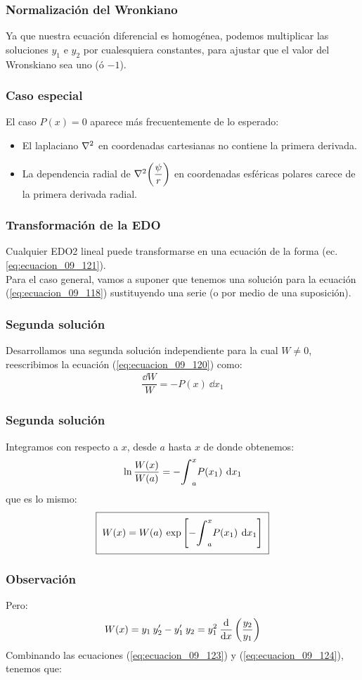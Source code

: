 \documentclass[12pt]{beamer}
\begin{document}
\begin{frame}
\frametitle{Normalización del Wronkiano}
Ya que nuestra ecuación diferencial es homogénea, podemos multiplicar las soluciones $y_{1}$ e $y_{2}$ por cualesquiera constantes, para ajustar que el valor del Wronskiano sea uno (ó $-1$).
\end{frame}
\begin{frame}
\frametitle{Caso especial}
El caso $P(x) = 0$ aparece más frecuentemente de lo esperado:
\begin{itemize}
\item[\ding{212}] El laplaciano $\laplacian$ en coordenadas cartesianas no contiene la primera derivada.
\item[\ding{212}] La dependencia radial de $\laplacian (\dfrac{\psi}{r})$ en coordenadas esféricas polares carece de la primera derivada radial.
\end{itemize}
\end{frame}
\begin{frame}
\frametitle{Transformación de la EDO}
Cualquier EDO2 lineal puede transformarse en una ecuación de la forma (ec. \ref{eq:ecuacion_09_121}).
\\
\bigskip
\pause
Para el caso general, vamos a suponer que tenemos una solución para la ecuación (\ref{eq:ecuacion_09_118}) sustituyendo una serie (o por medio de una suposición). 
\end{frame}
\begin{frame}
\frametitle{Segunda solución}
Desarrollamos una segunda solución independiente para la cual $W \neq 0$, reescribimos la ecuación (\ref{eq:ecuacion_09_120}) como:
\pause
\begin{align*}
\dfrac{\dd{W}}{W} = - P(x) \: \dd{x_{1}}
\end{align*}
\end{frame}
\begin{frame}
\frametitle{Segunda solución}
Integramos con respecto a $x$, desde $a$ hasta $x$ de donde obtenemos:
\pause
\begin{align*}
\ln \dfrac{W(x)}{W(a)} = - \scaleint{6ex}_{a}^{x} P(x_{1}) \: \dd{x_{1}}
\end{align*}
\pause
que es lo mismo:
\pause
\begin{align}
\setlength{\fboxsep}{2\fboxsep}\boxed{W(x) = W(a) \: \exp \left[ - \scaleint{6ex}_{a}^{x} P(x_{1}) \: \dd{x_{1}} \right]}
\label{eq:ecuacion_09_123}
\end{align}
\end{frame}
\begin{frame}
\frametitle{Observación}
Pero:
\pause
\begin{align}
W(x) = y_{1} \: {y}^{\prime}_{2} - {y}^{\prime}_{1} \: y_{2} = y_{1}^{2} \: \dv{x} \left( \dfrac{y_{2}}{y_{1}} \right)
\label{eq:ecuacion_09_124}
\end{align}
Combinando las ecuaciones (\ref{eq:ecuacion_09_123}) y (\ref{eq:ecuacion_09_124}), tenemos que:
\end{frame}
\end{document}
